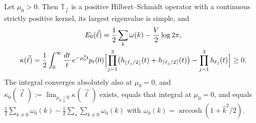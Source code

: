 \begin{lemma}\label{lem:freevacuum}
Let $\mu_0>0$. Then $\mathbb T_{\vec\ell}$ is a positive Hilbert--Schmidt
operator with a continuous strictly positive kernel, its largest eigenvalue
is simple, and
\begin{gather*}
E_0(\vec\ell)=\frac12\sum_k\omega(k)-\frac V2\log2\pi,\\
\kappa(\vec\ell)=\frac12\int_0^\infty\frac{dt}t\,e^{-\mu_0^2t}p_t(0)\Bigl[
\prod_{j=1}^3\bigl(h_{\lfloor\ell_j/2\rfloor}(t)+h_{\lceil\ell_j/2\rceil}(t)
\bigr)-\prod_{j=1}^3h_{\ell_j}(t)\Bigr]\ge0 .
\end{gather*}
The integral converges absolutely also at $\mu_0=0$, and $\kappa_0(\vec\ell)
:=\lim_{\mu_0\downarrow0}\kappa(\vec\ell)$ exists, equals that integral at
$\mu_0=0$, and equals $\frac12\sum_{k\ne0}\omega_0(k)-\frac12\sum_s\sum_{k\ne
0}\omega_0(k)$ with $\omega_0(k)=\operatorname{arccosh}(1+\hat k^2/2)$.
\end{lemma}

